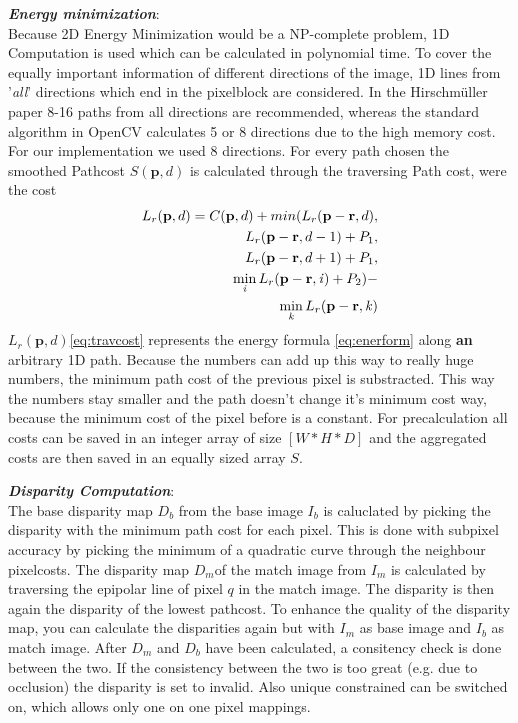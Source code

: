 \documentclass[a4paper]{article}
\begin{document}
\emph{\textbf{Energy minimization}}:\\ Because 2D Energy Minimization
would be a NP-complete problem, 1D Computation is used which can be
calculated in polynomial time. To cover the equally important
information of different directions of the image, 1D lines from
'\textit{all}' directions which end in the pixelblock are
considered. In the Hirschm\"{u}ller paper 8-16 paths from all
directions are recommended, whereas the standard algorithm in OpenCV
calculates 5 or 8 directions due to the high memory cost. For our
implementation we used 8 directions. For every path chosen the
smoothed Pathcost $S(\mathbf{p},d)$ is calculated through the
traversing Path cost, were the cost
\begin{align}
  L_{r}(\mathbf{p},d) = 
C(\mathbf{p},d) + min(L_{r}(\mathbf{p} -
\mathbf{r}, d), 
\notag\\
L_{r}(\mathbf{p} - \mathbf{r}, d - 1) + P_1,
\notag\\
L_{r}(\mathbf{p} - \mathbf{r}, d + 1) + P_1,
\\
\displaystyle\min\limits_{\mathit{i}} L_{r}(\mathbf{p} - \mathbf{r}, \mathit{i}) +
P_2) -
\notag\\
\displaystyle\min\limits_{\mathit{k}} L_{r}(\mathbf{p} -
\mathbf{r}, \mathit{k})\notag
\label{eq:travcost}
\end{align}
$L_{r}(\mathbf{p},d)$\eqref{eq:travcost} represents the energy
formula \eqref{eq:enerform} along \textbf{an} arbitrary 1D
path. Because the numbers can add up this way to really huge numbers,
the minimum path cost of the previous pixel is substracted. This way
the numbers stay smaller and the path doesn't change it's minimum cost
way, because the minimum cost of the pixel before is a constant.
For precalculation all costs can be saved in an integer array of size
$[W*H*D]$ and the aggregated costs are then saved in an equally sized
array $S$.

\emph{\textbf{Disparity Computation}}:\\
The base disparity map $D_b$ from the base image $I_b$ is caluclated by
picking the disparity with the minimum path cost for each pixel. This
is done with subpixel accuracy by picking the minimum of a quadratic
curve through the neighbour pixelcosts. The disparity map $D_m$of
the match image from $I_m$ is calculated by traversing the epipolar
line of pixel $q$ in the match image. The disparity is then again the
disparity of the lowest pathcost. To enhance the quality of the
disparity map, you can calculate the disparities again but with $I_m$
as base image and $I_b$ as match image. After $D_m$ and $D_b$ have
been calculated, a consitency check is done between the two. If the
consistency between the two is too great (e.g. due to occlusion) the
disparity is set to invalid. Also unique constrained can be switched
on, which allows only one on one pixel mappings.
\end{document}
